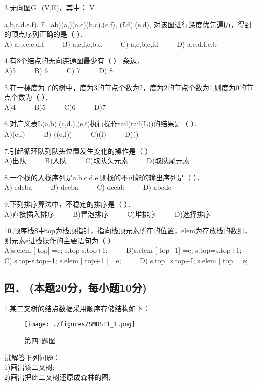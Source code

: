 3.无向图G=(V,E)，其中： V={a,b,c.d.e.f). E={ab)(a,)(a.c)(b.c).(c.f), (f.d).(e.d)}, 对该图进行深度优先遍历，得到的顶点序列正确的是（ ）． \\
A) a,b,e,c.d,f $\qquad$ B) a,c,f,e,b.d $\qquad$ C) a,e,b,c,fd $\qquad$ D) a,e.d.f.c,b

4.有8个结点的无向连通图最少有（ ） 条边． \\
A)5 $\qquad$ B) 6 $\qquad$ C) 7 $\qquad$ D) 8

5.在一棵度为了的树中，度为3的节点个数为2，度为2的节点个数为1,则度为0的节点个数为（  ）． \\
A)4 $\qquad$ B)5 $\qquad$ C)6 $\qquad$ D)7

6.对广义表L(a,b),(c,d.),(e,f)执行操作tail(tail(L))的结果是（  ）． \\
A)(e,f) $\qquad$ B) ((e,f)) $\qquad$ C)(f) $\qquad$ D)()

7.引起循环队列队头位置发生变化的操作是（ ）. \\
A)出队 $\qquad$ B)入队 $\qquad$ C)取队头元素 $\qquad$ D)取队尾元素

8.一个栈的入栈序列是a.b.c.d.e.则栈的不可能的输出序列是（ ）． \\
A) edcba $\qquad$ B) decba $\qquad$ C) dceab $\qquad$ D) abcde

9.下列排序算法中，不稳定的排序是（  ）． \\
A)直接插入排序 $\qquad$ B)冒泡排序 $\qquad$ C)堆排序 $\qquad$ D)选择排序

10.顺序栈S中top为栈顶指针，指向栈顶元素所在的位置，elem为存放栈的数组，则元素e进栈操作的主要语句为（  ） \\
A)s.elem [ top] =e; s.top-s.top+1; $\qquad$ B)s.elem [ top+1] =e; s.top=s.top+1; \\
C) s.top-s.top+1; s.elem [ top+1 ] =e; $\qquad$ D) s.top=s.top+I; s.elem [ top ]=e;

\subsection{四． (本题20分，每小题10分)}
1.某二叉树的结点数据采用顺序存储结构如下： \\
\begin{figure}[ht]
\centering
\texttt{[image: ./figures/SMDS11\_1.png]}
\caption{第四1题图} \label{SMDS11_fig1}
\end{figure}
试解答下列问题： \\
1)画出该二叉树; \\
2)画出把此二叉树还原成森林的图;

}

